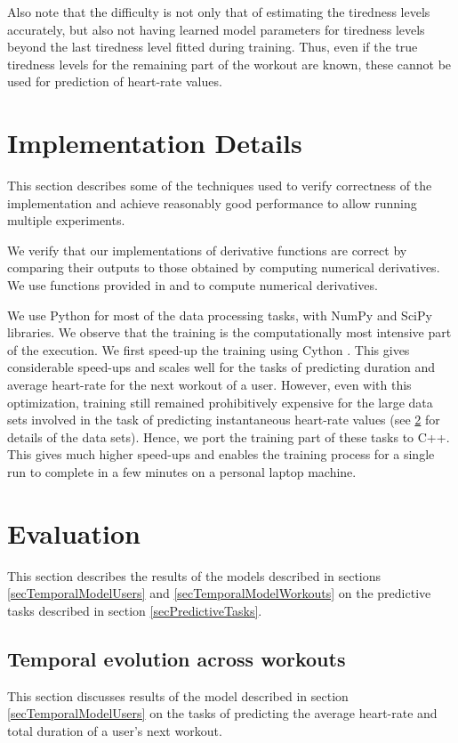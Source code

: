 \documentclass{acm_proc_article-sp}
\begin{document}
Also note that the difficulty is not only that of estimating the tiredness levels accurately, but also not having learned model parameters for tiredness levels beyond the last tiredness level fitted during training. Thus, even if the true tiredness levels for the remaining part of the workout are known, these cannot be used for prediction of heart-rate values.

\section{Implementation Details}
This section describes some of the techniques used to verify correctness of the implementation and achieve reasonably good performance to allow running multiple experiments.

We verify that our implementations of derivative functions are correct by comparing their outputs to those obtained by computing numerical derivatives. We use functions provided in \cite{scipy} and \cite{dlib} to compute numerical derivatives.

We use Python for most of the data processing tasks, with NumPy \cite{numpy} and SciPy \cite{scipy} libraries. We observe that the training is the computationally most intensive part of the execution. We first speed-up the training using Cython \cite{cythonNumpy}. This gives considerable speed-ups and scales well for the tasks of predicting duration and average heart-rate for the next workout of a user. However, even with this optimization, training still remained prohibitively expensive for the large data sets involved in the task of predicting instantaneous heart-rate values (see \ref{secEvaluation} for details of the data sets). Hence, we port the training part of these tasks to C++. This gives much higher speed-ups and enables the training process for a single run to complete in a few minutes on a personal laptop machine.

\section{Evaluation}
\label{secEvaluation}
This section describes the results of the models described in sections \ref{secTemporalModelUsers} and \ref{secTemporalModelWorkouts} on the predictive tasks described in section \ref{secPredictiveTasks}. 

\subsection{Temporal evolution across workouts}
This section discusses results of the model described in section \ref{secTemporalModelUsers} on the tasks of predicting the average heart-rate and total duration of a user's next workout.
\end{document}

